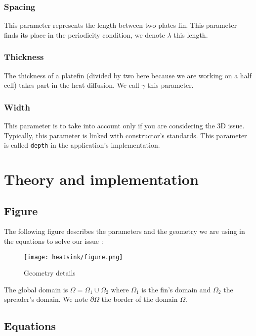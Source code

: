 \subsubsection{Spacing}
This parameter represents the length between two plates fin. This parameter finds its place in the periodicity condition, we denote $\lambda$ this length.

\subsubsection{Thickness}
The thickness of a platefin (divided by two here because we are working on a half cell) takes part in the heat diffusion. We call $\gamma$ this parameter.

\subsubsection{Width}

This parameter is to take into account only if you are considering the 3D issue. Typically, this parameter is linked with constructor's standards. This parameter is called \lstinline!depth! in the application's implementation.


\section{Theory and implementation}
\label{therm:equations}

\subsection{Figure}
The following figure describes the parameters and the geometry we are using in the equations to solve our issue :
\begin{figure}[!h]
\centering
\texttt{[image: heatsink/figure.png]}
\caption{Geometry details}
\end{figure}


The global domain is $\varOmega = \varOmega_1 \cup \varOmega_2 $ where $\varOmega_1$ is the fin's domain and $\varOmega_2$ the spreader's domain. We note $\partial\varOmega$ the border of the domain $\varOmega$.


\subsection{Equations}

